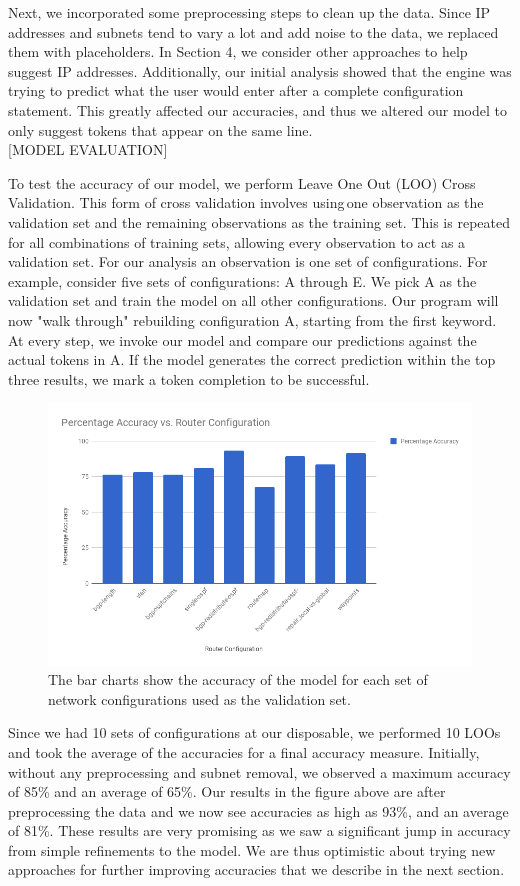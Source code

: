 Next, we incorporated some preprocessing steps to clean up the data. Since IP addresses and subnets tend to vary a lot and add noise to the data, we replaced them with placeholders. In Section 4, we consider other approaches to help suggest IP addresses. Additionally, our initial analysis showed that the engine was trying to predict what the user would enter after a complete configuration statement. This greatly affected our accuracies, and thus we altered our model to only suggest tokens that appear on the same line.\\

[MODEL EVALUATION]

To test the accuracy of our model, we perform Leave One Out (LOO) Cross Validation. This form of cross validation involves using one observation as the validation set and the remaining observations as the training set. This is repeated for all combinations of training sets, allowing every observation to act as a validation set. For our analysis an observation is one set of configurations. For example, consider five sets of configurations: A through E. We pick A as the validation set and train the model on all other configurations. Our program will now "walk through" rebuilding configuration A, starting from the first keyword. At every step, we invoke our model and compare our predictions against the actual tokens in A. If the model generates the correct prediction within the top three results, we mark a token completion to be successful.\\
 
\begin{figure}[H]
	\centering
	\includegraphics[width=\textwidth]{model_analysis.png}
	\caption{The bar charts show the accuracy of the model for each set of network configurations used as the validation set.}
\end{figure}
Since we had 10 sets of configurations at our disposable, we performed 10 LOOs and took the average of the accuracies for a final accuracy measure. Initially, without any preprocessing and subnet removal, we observed a maximum accuracy of 85\% and an average of 65\%. Our results in the figure above are after preprocessing the data and we now see accuracies as high as 93\%, and an average of 81\%. These results are very promising as we saw a significant jump in accuracy from simple refinements to the model. We are thus optimistic about trying new approaches for further improving accuracies that we describe in the next section.